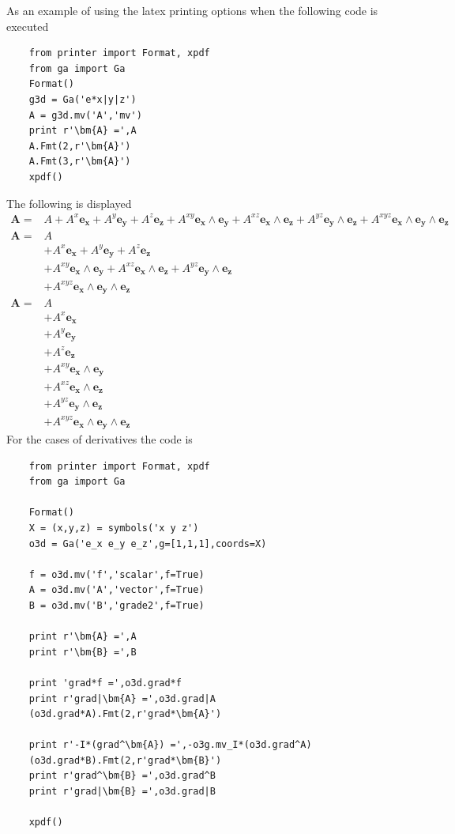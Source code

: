 \documentclass[12pt,twoside,openright]{memoir}
\newcommand{\bm}[1]{\boldsymbol{#1}}
\newcommand{\W}{\wedge}
\begin{document}
As an example of using the latex printing options when the following code is
executed
\begin{lstlisting}
    from printer import Format, xpdf
    from ga import Ga
    Format()
    g3d = Ga('e*x|y|z')
    A = g3d.mv('A','mv')
    print r'\bm{A} =',A
    A.Fmt(2,r'\bm{A}')
    A.Fmt(3,r'\bm{A}')
    xpdf()
\end{lstlisting}
The following is displayed
\begin{align*}
      \bm{A} = & A+A^{x}\bm{e_{x}}+A^{y}\bm{e_{y}}+A^{z}\bm{e_{z}}+A^{xy}\bm{e_{x}\W e_{y}}+A^{xz}\bm{e_{x}\W e_{z}}+A^{yz}\bm{e_{y}\W e_{z}}+A^{xyz}\bm{e_{x}\W e_{y}\W e_{z}} \\
      \bm{A} =  & A \\  & +A^{x}\bm{e_{x}}+A^{y}\bm{e_{y}}+A^{z}\bm{e_{z}} \\  & +A^{xy}\bm{e_{x}\W e_{y}}+A^{xz}\bm{e_{x}\W e_{z}}+A^{yz}\bm{e_{y}\W e_{z}} \\  & +A^{xyz}\bm{e_{x}\W e_{y}\W e_{z}} \\
      \bm{A} =  & A \\  & +A^{x}\bm{e_{x}} \\  & +A^{y}\bm{e_{y}} \\  & +A^{z}\bm{e_{z}} \\  & +A^{xy}\bm{e_{x}\W e_{y}} \\  & +A^{xz}\bm{e_{x}\W e_{z}} \\  & +A^{yz}\bm{e_{y}\W e_{z}} \\  & +A^{xyz}\bm{e_{x}\W e_{y}\W e_{z}}
\end{align*}
For the cases of derivatives the code is
\begin{lstlisting}
    from printer import Format, xpdf
    from ga import Ga

    Format()
    X = (x,y,z) = symbols('x y z')
    o3d = Ga('e_x e_y e_z',g=[1,1,1],coords=X)

    f = o3d.mv('f','scalar',f=True)
    A = o3d.mv('A','vector',f=True)
    B = o3d.mv('B','grade2',f=True)

    print r'\bm{A} =',A
    print r'\bm{B} =',B

    print 'grad*f =',o3d.grad*f
    print r'grad|\bm{A} =',o3d.grad|A
    (o3d.grad*A).Fmt(2,r'grad*\bm{A}')

    print r'-I*(grad^\bm{A}) =',-o3g.mv_I*(o3d.grad^A)
    (o3d.grad*B).Fmt(2,r'grad*\bm{B}')
    print r'grad^\bm{B} =',o3d.grad^B
    print r'grad|\bm{B} =',o3d.grad|B

    xpdf()
\end{lstlisting}
\end{document}
